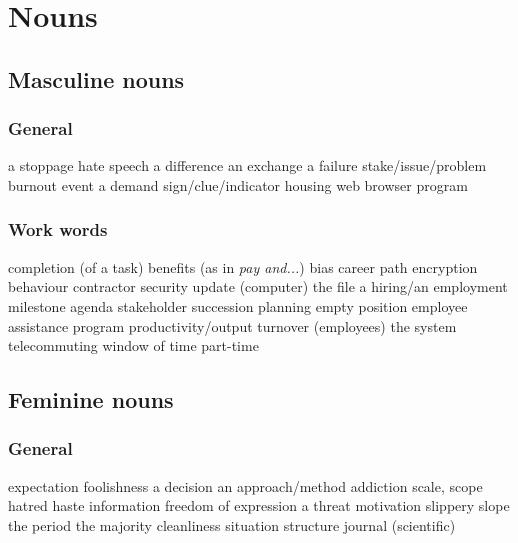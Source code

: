 \section{Nouns}
\subsection*{Masculine nouns}
\subsubsection*{General}
   {a stoppage}
   {hate speech}
   {a difference}
   {an exchange}
   {a failure}
   {stake/issue/problem}
 {burnout}
   {event}
   {a demand}
   {sign/clue/indicator}
   {housing}
   {web browser}
   {program}
\subsubsection*{Work words}
   {completion (of a task)}
   {benefits (as in {\em pay and...})}
   {bias}
   {career path}
   {encryption}
   {behaviour}
   {contractor}
   {security update (computer)}
   {the file}
   {a hiring/an employment}
   {milestone}
   {agenda}
   {stakeholder}
   {succession planning}
   {empty position}
   {employee assistance program}
   {productivity/output}
   {turnover (employees)}
   {the system}
   {telecommuting}
   {window of time}
   {part-time}
\subsection*{Feminine nouns}
\subsubsection*{General}
   {expectation}
   {foolishness}
   {a decision}
   {an approach/method}
   {addiction}
   {scale, scope}
   {hatred}
   {haste}
   {information}
   {freedom of expression}
   {a threat}
   {motivation}
   {slippery slope}
   {the period}
   {the majority}
   {cleanliness}
   {situation}
   {structure}
   {journal (scientific)}
